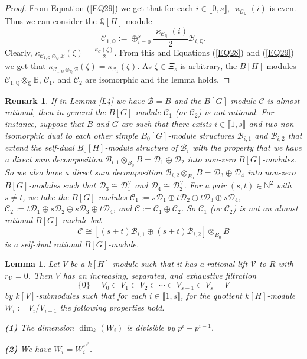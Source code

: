 \documentclass[11pt]{amsart}
\newtheorem{lemma}[theorem]{Lemma}
\newtheorem{remark}[theorem]{Remark}
\begin{document}
\begin{proof}
From Equation (\ref{EQ29}) we get that for each $i\in\llbracket0,s\rrbracket$, $\varkappa_{\mathcal C_{\mathbb Q}}(i)$ is even. Thus we can consider the $\mathbb Q[H]$-module 
$$\mathcal C_{1,\mathbb Q}:=\oplus_{i=0}^s \frac{\varkappa_{\mathcal C_{\mathbb Q}}(i)}{2}\mathcal B_{i,\mathbb Q}.$$
Clearly, $\kappa_{\mathcal C_{1,\mathbb Q}\otimes_{\mathbb Q} \mathcal B}(\zeta)=\frac{\kappa_{\mathcal C}(\zeta)}{2}$. From this and Equations (\ref{EQ28}) and (\ref{EQ29}) we get that $\kappa_{\mathcal C_{1,\mathbb Q}\otimes_{\mathbb Q} \mathcal B}(\zeta)=\kappa_{\mathcal C_1}(\zeta)$. As $\zeta\in\Xi_s$ is arbitrary, the $B[H]$-modules $\mathcal C_{1,\mathbb Q}\otimes_{\mathbb Q} \mathbb B$, $\mathcal C_1$, and $\mathcal C_2$ are isomorphic and the lemma holds.
\end{proof}

\begin{remark}\normalfont\label{R1}
If in Lemma \ref{L4} we have $\mathcal B=B$ and the $B[G]$-module $\mathcal C$ is almost rational, then in general the $B[G]$-module $\mathcal C_1$ (or $\mathcal C_2$) is not rational. For instance, suppose that $B$ and $G$ are such that there exists $i\in\llbracket1,s\rrbracket$ and two non-isomorphic dual to each other simple $B_0[G]$-module structures $\mathcal B_{i,1}$ and $\mathcal B_{i,2}$ that extend the self-dual $B_0[H]$-module structure of $\mathcal B_i$ with the property that we have a direct sum decomposition $\mathcal B_{i,1}\otimes_{B_0} B=\mathcal D_1\oplus\mathcal D_2$ into non-zero $B[G]$-modules. So we also have a direct sum decomposition $\mathcal B_{i,2}\otimes_{B_0} B=\mathcal D_3\oplus\mathcal D_4$ into non-zero $B[G]$-modules such that $\mathcal D_3\cong \mathcal D_1^{\vee}$ and $\mathcal D_4\cong\mathcal D_2^{\vee}$. For a pair $(s,t)\in\mathbb N^2$ with $s\neq t$, we take the $B[G]$-modules $\mathcal C_1:=s\mathcal D_1\oplus t\mathcal D_2\oplus t\mathcal D_3\oplus s\mathcal D_4$, $\mathcal C_2:=t\mathcal D_1\oplus s\mathcal D_2\oplus s\mathcal D_3\oplus t\mathcal D_4$, and $\mathcal C:=\mathcal C_1\oplus\mathcal C_2$. So $\mathcal C_1$ (or $\mathcal C_2$) is not an almost rational $B[G]$-module but 
$$\mathcal C\cong [(s+t)\mathcal B_{i,1}\oplus (s+t)\mathcal B_{i,2}]\otimes_{B_0} B$$ 
is a self-dual rational $B[G]$-module.
\end{remark}

\begin{lemma}\label{L5}
Let $V$ be a $k[H]$-module such that it has a rational lift $\mathcal V$ to $R$ with $r_{\mathcal V}=0$. Then $V$ has an increasing, separated, and exhaustive filtration
\begin{equation}\label{EQ30}
\{0\}=V_0\subset V_1\subset V_2\subset\cdots\subset V_{s-1}\subset V_s=V
\end{equation}
by $k[V]$-submodules such that for each $i\in\llbracket1,s\rrbracket$, for the quotient $k[H]$-module $W_i:=V_i/V_{i-1}$ the following properties hold.

\medskip
{\bf (1)} The dimension $\dim_k(W_i)$ is divisible by $p^i-p^{i-1}$.

\smallskip
{\bf (2)} We have $W_i=W_i^{\tau^{p^i}}$.
\end{lemma}
\end{document}
